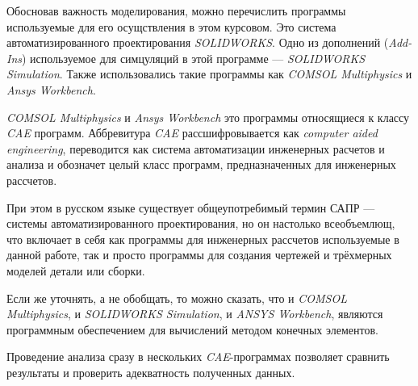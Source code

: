 Обосновав важность моделирования,
можно перечислить программы используемые для его осущствления в этом курсовом.
Это система автоматизированного проектирования \textit{SOLIDWORKS}.
Одно из дополнений (\textit{Add-Ins}) используемое для симцуляций в этой программе — \textit{SOLIDWORKS Simulation}.
Также использовались такие программы как \textit{COMSOL Multiphysics} и \textit{Ansys Workbench}.

\textit{COMSOL Multiphysics} и \textit{Ansys Workbench} это программы относящиеся к классу \textit{CAE} программ.
Аббревитура \textit{CAE} рассшифровывается как \textit{computer aided engineering},
переводится как система автоматизации инженерных расчетов и анализа и обозначет целый класс программ,
предназначенных для инженерных рассчетов.

При этом в русском языке существует общеупотребимый термин САПР — системы автоматизированного проектирования,
но он настолько всеобъемлющ, что включает в себя как программы для инженерных рассчетов используемые в данной работе,
так и просто программы для создания чертежей и трёхмерных моделей детали или сборки.

Если же уточнять, а не обобщать, то можно сказать,
что и \textit{COMSOL Multiphysics}, и \textit{SOLIDWORKS Simulation},  и \textit{ANSYS Workbench},
являются программным обеспечением для вычислений методом конечных элементов.

Проведение анализа сразу в нескольких \textit{CAE}-программах позволяет сравнить результаты и проверить адекватность полученных данных.